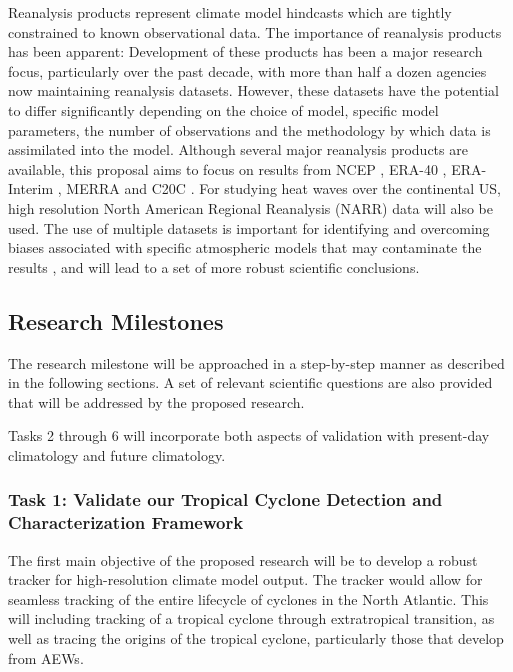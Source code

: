 \documentclass[11pt]{article}
\begin{document}
Reanalysis products represent climate model hindcasts which are tightly constrained to known observational data.  The importance of reanalysis products has been apparent:  Development of these products has been a major research focus, particularly over the past decade, with more than half a dozen agencies now maintaining reanalysis datasets.  However, these datasets have the potential to differ significantly depending on the choice of model, specific model parameters, the number of observations and the methodology by which data is assimilated into the model.  Although several major reanalysis products are available, this proposal aims to focus on results from NCEP \citep{kalnay1996ncep}, ERA-40 \citep{uppala2005era}, ERA-Interim \citep{simmons2007era}, MERRA \citep{rienecker2011merra} and C20C \citep{compo2011twentieth}.  For studying heat waves over the continental US, high resolution North American Regional Reanalysis (NARR) data will also be used.  The use of multiple datasets is important for identifying and overcoming biases associated with specific atmospheric models that may contaminate the results \citep{jun2008spatial}, and will lead to a set of more robust scientific conclusions.

\subsection{Research Milestones} \label{sec:ResearchMilestones}

The research milestone will be approached in a step-by-step manner as described in the following sections. A set of relevant scientific questions are also provided that will be addressed by the proposed research.

Tasks 2 through 6 will incorporate both aspects of validation with present-day climatology and future climatology.

\subsubsection{Task 1: Validate our Tropical Cyclone Detection and Characterization Framework}

The first main objective of the proposed research will be to develop a robust tracker for high-resolution climate model output. The tracker would allow for seamless tracking of the entire lifecycle of cyclones in the North Atlantic. This will including tracking of a tropical cyclone through extratropical transition, as well as tracing the origins of the tropical cyclone, particularly those that develop from AEWs. 
\end{document}
